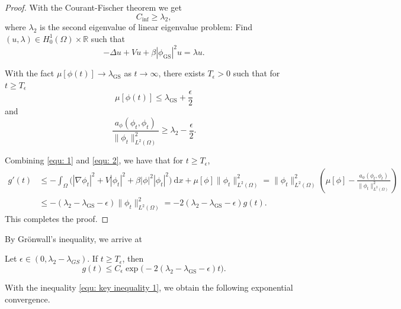 \documentclass{siamart250211}
\def\R{\mathbb{R}}
\begin{document}
\begin{proof}
With the Courant-Fischer theorem we get
\begin{equation*}
	C_{\text{inf}} \ge \lambda_2,
\end{equation*}
where $\lambda_2$ is the second eigenvalue of linear eigenvalue problem: Find $(u,\lambda) \in H_0^1(\Omega) \times \R$ such that
\begin{equation*}
	- \Delta u + V u + \beta |\phi_{\text{GS}}|^2 u = \lambda u.
\end{equation*}
	
With the fact $\mu[\phi(t)] \to \lambda_{\text{GS}}$ as $t \to \infty$, there exists $T_{\epsilon} > 0$ such that for $t \ge T_{\epsilon}$
\begin{equation}\label{equ: 1}
	\mu[\phi(t)] \le \lambda_{\text{GS}} + \frac{\epsilon}{2}
\end{equation}
and 
\begin{equation}\label{equ: 2}
	\frac{a_{\phi}(\phi_t,\phi_t)}{\|\phi_t\|_{L^2(\Omega)}^2} \ge \lambda_2 - \frac{\epsilon}{2}.
\end{equation}

Combining \eqref{equ: 1} and \eqref{equ: 2}, we have that for $t \ge T_{\epsilon}$, 
\begin{align*}
	g'(t) & \le - \int_{\Omega} \Big( |\nabla \phi_t|^2 + V|\phi_t|^2 + \beta|\phi|^2 |\phi_t|^2 \Big) \ \text{d}x + \mu[\phi]\|\phi_t\|_{L^2(\Omega)}^2  = \|\phi_t\|_{L^2(\Omega)}^2 \left( \mu[\phi] - \frac{a_{\phi}(\phi_t,\phi_t)}{\|\phi_t\|_{L^2(\Omega)}^2} \right) \\
	& \le - (\lambda_2 - \lambda_{\text{GS}} - \epsilon) \|\phi_t\|_{L^2(\Omega)}^2 = -2(\lambda_2 - \lambda_{\text{GS}} - \epsilon)g(t).
\end{align*}
This completes the proof.
\end{proof}

By Gr\"onwall's inequality, we arrive at
\begin{coro}\label{coro: 1}
Let
 $\epsilon\in(0,\lambda_2 - \lambda_{GS})$. If $t \ge T_{\epsilon}$, then 
	\begin{equation}\label{equ: key inequality 1}
		g(t) \le C_{\epsilon} \exp\big(-2(\lambda_2 - \lambda_{\text{GS}} - \epsilon) t \big).
	\end{equation}	
\end{coro}

With the inequality \eqref{equ: key inequality 1}, we obtain the following exponential convergence.
\end{document}

